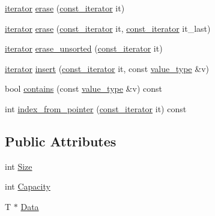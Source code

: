 \begin{DoxyCompactItemize}
\item 
\mbox{\hyperlink{class_im_vector_a74b5478f1f6fd471cc71219bce483db6}{iterator}} \mbox{\hyperlink{class_im_vector_a1e1fd9b678be9d4b4432fbefde976045}{erase}} (\mbox{\hyperlink{class_im_vector_aedeac9c5080f9d6ce96ae837768ee4c4}{const\+\_\+iterator}} it)
\item 
\mbox{\hyperlink{class_im_vector_a74b5478f1f6fd471cc71219bce483db6}{iterator}} \mbox{\hyperlink{class_im_vector_a908dd550be687acdbeadcf0500374276}{erase}} (\mbox{\hyperlink{class_im_vector_aedeac9c5080f9d6ce96ae837768ee4c4}{const\+\_\+iterator}} it, \mbox{\hyperlink{class_im_vector_aedeac9c5080f9d6ce96ae837768ee4c4}{const\+\_\+iterator}} it\+\_\+last)
\item 
\mbox{\hyperlink{class_im_vector_a74b5478f1f6fd471cc71219bce483db6}{iterator}} \mbox{\hyperlink{class_im_vector_a0948ac4ab740ea42c6cd11a279a4b9a6}{erase\+\_\+unsorted}} (\mbox{\hyperlink{class_im_vector_aedeac9c5080f9d6ce96ae837768ee4c4}{const\+\_\+iterator}} it)
\item 
\mbox{\hyperlink{class_im_vector_a74b5478f1f6fd471cc71219bce483db6}{iterator}} \mbox{\hyperlink{class_im_vector_a52fdb731c13c82a1fd971186c6a701b5}{insert}} (\mbox{\hyperlink{class_im_vector_aedeac9c5080f9d6ce96ae837768ee4c4}{const\+\_\+iterator}} it, const \mbox{\hyperlink{class_im_vector_a8bd77e4e7581d8e5f9e98d7c2f3c2a80}{value\+\_\+type}} \&v)
\item 
bool \mbox{\hyperlink{class_im_vector_a8d3d5f3462afbf38d9e8f410ebd085ee}{contains}} (const \mbox{\hyperlink{class_im_vector_a8bd77e4e7581d8e5f9e98d7c2f3c2a80}{value\+\_\+type}} \&v) const
\item 
int \mbox{\hyperlink{class_im_vector_aab9b55d6496e7fc637a3c3e90f793504}{index\+\_\+from\+\_\+pointer}} (\mbox{\hyperlink{class_im_vector_aedeac9c5080f9d6ce96ae837768ee4c4}{const\+\_\+iterator}} it) const
\end{DoxyCompactItemize}
\subsection*{Public Attributes}
\begin{DoxyCompactItemize}
\item 
int \mbox{\hyperlink{class_im_vector_abbfd157947f66280d27b21d70a16df8d}{Size}}
\item 
int \mbox{\hyperlink{class_im_vector_abd24482b4d30d22e37582e521e5bfb33}{Capacity}}
\item 
T $\ast$ \mbox{\hyperlink{class_im_vector_ac0e46e8b30cb079d93c8f0aad7d7cbd0}{Data}}
\end{DoxyCompactItemize}


